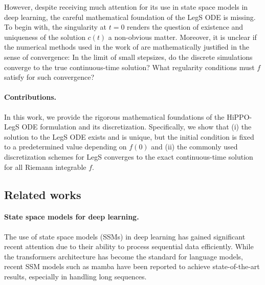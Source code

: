 \documentclass{article}
\theoremstyle{definition}
\begin{document}
However, despite receiving much attention for its use in state space models in deep learning, the careful mathematical foundation of the LegS ODE is missing. To begin with, the singularity at $t=0$ renders the question of existence and uniqueness of the solution $c(t)$ a non-obvious matter. Moreover, it is unclear if the numerical methods used in the work of \cite{gu2020hippo} are mathematically justified in the sense of convergence: In the limit of small stepsizes, do the discrete simulations converge to the true continuous-time solution? What regularity conditions must $f$ satisfy for such convergence?


\paragraph{Contributions.} 
In this work, we provide the rigorous mathematical foundations of the HiPPO-LegS ODE formulation and its discretization. Specifically, we show that (i) the solution to the LegS ODE exists and is unique, but the initial condition is fixed to a predetermined value depending on $f(0)$ and (ii) the commonly used discretization schemes for LegS converges to the exact continuous-time solution for all Riemann integrable $f$.







\subsection{Related works} \label{sec:related_works}

\paragraph{State space models for deep learning.}
The use of state space models (SSMs) in deep learning has gained significant recent attention due to their ability to process sequential data efficiently.
While the transformers architecture \citep{vaswani2017attention} has become the standard for language models, recent SSM models such as mamba  \citep{gu_mamba_2023} have been reported to achieve state-of-the-art results, especially in handling long sequences.
\end{document}
